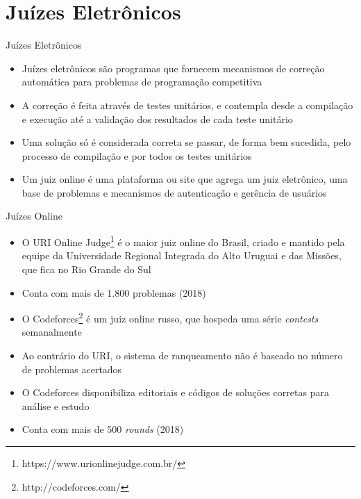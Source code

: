 \section{Juízes Eletrônicos}

\begin{frame}[fragile]{Juízes Eletrônicos}

    \begin{itemize}
        \item Juízes eletrônicos são programas que fornecem mecanismos de correção automática para 
        problemas de programação competitiva
        \item A correção é feita através de testes unitários, e contempla desde a compilação e 
        execução até a validação dos resultados de cada teste unitário
        \item Uma solução só é considerada correta se passar, de  forma  bem  sucedida,
        pelo  processo de  compilação  e por todos os testes unitários
        \item Um juiz online é uma plataforma ou site que agrega um juiz eletrônico, uma base de
        problemas e mecanismos de autenticação e gerência de usuários
    \end{itemize}

\end{frame}

\begin{frame}[fragile]{Juízes Online}

    \begin{itemize}
        \item O URI Online Judge\footnote{https://www.urionlinejudge.com.br/} 
        é o maior juiz online do Brasil, criado e mantido pela equipe
        da Universidade Regional Integrada do Alto Uruguai e das Missões, que fica no 
        Rio Grande do Sul
        \item Conta com mais de 1.800 problemas (2018)
        \item O Codeforces\footnote{http://codeforces.com/} é um juiz online russo, que 
        hospeda uma série \textit{contests} semanalmente
        \item Ao contrário do URI, o sistema de ranqueamento não é baseado no número de problemas
        acertados
        \item O Codeforces disponibiliza editoriais e códigos de soluções corretas para análise e 
        estudo
        \item Conta com mais de 500 \textit{rounds} (2018)
   \end{itemize}

\end{frame}

